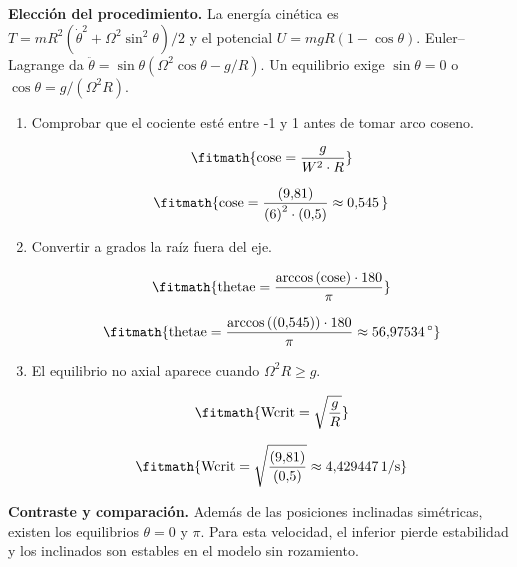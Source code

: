 \noindent\textbf{Elección del procedimiento.} La energía cinética es $T=mR^2(\dot\theta^2+\Omega^2\sin^2\theta)/2$ y el potencial $U=mgR(1-\cos\theta)$. Euler--Lagrange da $\ddot\theta=\sin\theta(\Omega^2\cos\theta-g/R)$. Un equilibrio exige $\sin\theta=0$ o $\cos\theta=g/(\Omega^2R)$.

\begin{enumerate}

\item Comprobar que el cociente esté entre -1 y 1 antes de tomar arco coseno.

\[\fitmath{\mathrm{cose}=\frac{g}{{W}^{2}\cdot R}}\]

\[\fitmath{\mathrm{cose}=\frac{(9{,}81)}{{(6)}^{2}\cdot (0{,}5)}\approx 0{,}545\,}\]

\item Convertir a grados la raíz fuera del eje.

\[\fitmath{\mathrm{thetae}=\frac{\arccos\left(\mathrm{cose}\right)\cdot 180}{\pi}}\]

\[\fitmath{\mathrm{thetae}=\frac{\arccos\left((0{,}545)\right)\cdot 180}{\pi}\approx 56{,}97534\,{}^{\circ}}\]

\item El equilibrio no axial aparece cuando $\Omega^2R\ge g$.

\[\fitmath{\mathrm{Wcrit}=\sqrt{\frac{g}{R}}}\]

\[\fitmath{\mathrm{Wcrit}=\sqrt{\frac{(9{,}81)}{(0{,}5)}}\approx 4{,}429447\,\mathrm{1/s}}\]

\end{enumerate}

\noindent\textbf{Contraste y comparación.} Además de las posiciones inclinadas simétricas, existen los equilibrios $\theta=0$ y $\pi$. Para esta velocidad, el inferior pierde estabilidad y los inclinados son estables en el modelo sin rozamiento.
